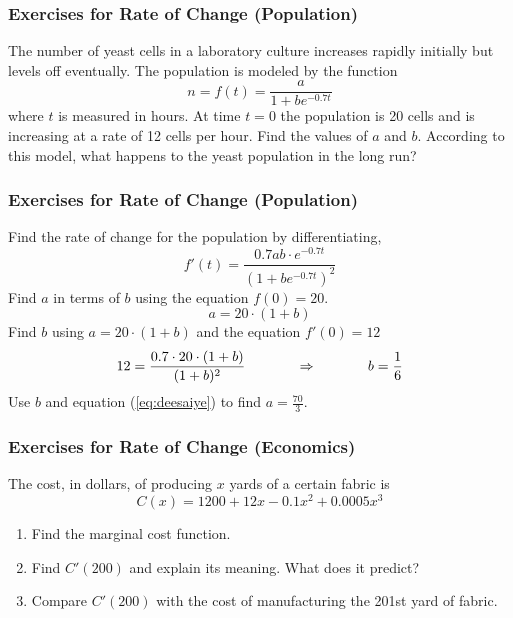 \documentclass[xcolor=dvipsnames]{beamer}
\begin{document}
\begin{frame}
  \frametitle{Exercises for Rate of Change (Population)}
The number of yeast cells in a laboratory culture increases rapidly
initially but levels off eventually. The population is modeled by the
function
\begin{equation}
  \label{eq:kupeivae}
  n=f(t)=\frac{a}{1+be^{-0.7t}}
\end{equation}
where $t$ is measured in hours. At time $t=0$ the population is 20
cells and is increasing at a rate of 12 cells per hour. Find the
values of $a$ and $b$. According to this model, what happens to the
yeast population in the long run?
\end{frame}

\begin{frame}
  \frametitle{Exercises for Rate of Change (Population)}
  Find the rate of change for the population by differentiating,
  \begin{equation}
    \label{eq:mohvuthe}
    f'(t)=\frac{0.7ab\cdot{}e^{-0.7t}}{\left(1+be^{-0.7t}\right)^{2}}
  \end{equation}
  Find $a$ in terms of $b$ using the equation $f(0)=20$.
  \begin{equation}
    \label{eq:deesaiye}
    a=20\cdot(1+b)
  \end{equation}
  Find $b$ using $a=20\cdot(1+b)$ and the equation $f'(0)=12$
  \begin{equation}
    \label{eq:oozeeroj}
    12=\frac{0.7\cdot{}20\cdot(1+b)}{(1+b)^{2}}\hspace{.5in}\Rightarrow\hspace{.5in}b=\frac{1}{6}
  \end{equation}
Use $b$ and equation (\ref{eq:deesaiye}) to find $a=\frac{70}{3}$. 
\end{frame}

\begin{frame}
  \frametitle{Exercises for Rate of Change (Economics)}
The cost, in dollars, of producing $x$ yards of a certain fabric is
\begin{equation}
  \label{eq:uquuthae}
  C(x)=1200+12x-0.1x^{2}+0.0005x^{3}
\end{equation}
\begin{enumerate}
\item Find the marginal cost function.
\item Find $C'(200)$ and explain its meaning. What does it
  predict?
\item Compare $C'(200)$ with the cost of manufacturing the 201st
  yard of fabric.
\end{enumerate}
\end{frame}
\end{document}
